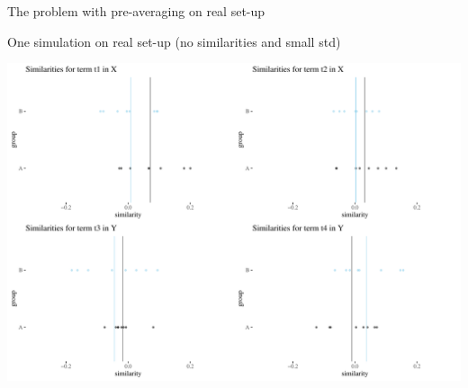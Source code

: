 \documentclass[
  10pt,
  ignorenonframetext,
  x11names, dvipsnames, bibspacing,natbib]{beamer}
\begin{document}
\begin{frame}{The problem with pre-averaging on real set-up}
\protect\hypertarget{the-problem-with-pre-averaging-on-real-set-up}{}
\begin{block}{One simulation on real set-up (no similarities and small
std)}
\protect\hypertarget{one-simulation-on-real-set-up-no-similarities-and-small-std}{}
\vspace{1mm}
\footnotesize

\begin{center}\includegraphics[width=0.7\linewidth]{presentationBoston_files/figure-beamer/unnamed-chunk-8-1} \end{center}
\end{block}
\end{frame}
\end{document}
